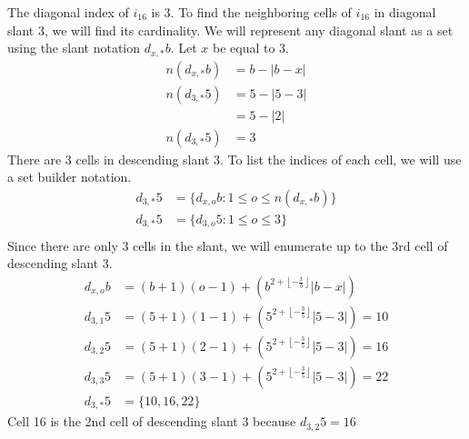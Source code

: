 \documentclass[twoside,openany,12pt]{book}
\begin{document}
    The diagonal index of $i_{16}$ is 3. To find the neighboring cells of $i_{16}$ in diagonal slant 3, we will find its cardinality. We will represent any diagonal slant as a set using the slant notation $d_{x,*}b$. Let $x$ be equal to 3.
    \begin{equation*}
        \begin{split}
            n(d_{x,*}b) &= b - |b - x| \\
            n(d_{3,*}5) &= 5 - |5 - 3| \\
                &= 5 - |2| \\
            n(d_{3,*}5) &= 3 
        \end{split}
    \end{equation*}
    There are 3 cells in descending slant 3. To list the indices of each cell, we will use a set builder notation.
    \begin{equation*}
        \begin{split}
            d_{3,*}5 &= \{ d_{x,o}b : 1 \leq o \leq n(d_{x,*}b) \} \\
            d_{3,*}5 &= \{ d_{3,o}5 : 1 \leq o \leq 3 \} \\
        \end{split}
    \end{equation*}
    Since there are only 3 cells in the slant, we will enumerate up to the 3rd cell of descending slant 3.
    \begin{equation*}
        \begin{split}
          d_{x,o}b &= (b+1)(o-1) + (b^{2 + \left\lfloor -\frac{x}{b} \right\rfloor }|b-x|) \\
            d_{3,1}5 &= (5+1)(1-1) + (5^{2 + \left\lfloor -\frac{3}{5} \right\rfloor }|5-3|) = 10\\
            d_{3,2}5 &= (5+1)(2-1) + (5^{2 + \left\lfloor -\frac{3}{5} \right\rfloor }|5-3|) = 16\\
            d_{3,3}5 &= (5+1)(3-1) + (5^{2 + \left\lfloor -\frac{3}{5} \right\rfloor }|5-3|) = 22\\
            d_{3,*}5 &= \{10, 16, 22\}
        \end{split}
    \end{equation*}
    Cell 16 is the 2nd cell of descending slant 3 because $d_{3,2}5 = 16$
\end{document}
